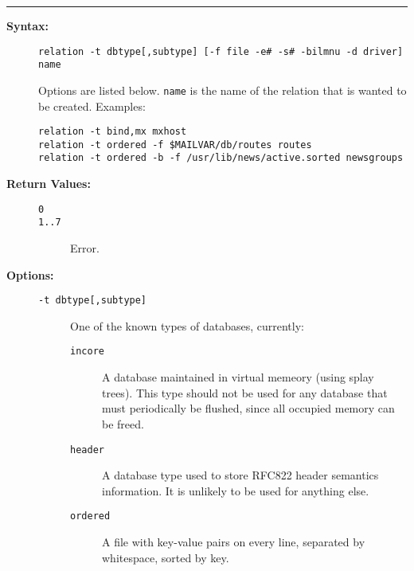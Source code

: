 \hrule
\begin{description}
\item[{\bf Syntax:}] \mbox{}

{\tt relation -t dbtype[,subtype] [-f file -e\# -s\# -bilmnu -d driver] name}

Options are listed below. {\tt name} is the name of the relation
that is wanted to be created. Examples:
\begin{tscreen}
\begin{verbatim}
relation -t bind,mx mxhost
relation -t ordered -f $MAILVAR/db/routes routes
relation -t ordered -b -f /usr/lib/news/active.sorted newsgroups
\end{verbatim}
\end{tscreen}




\item[{\bf Return Values:}] \mbox{}

\begin{description}
\item[{\tt 0}] \mbox{}



\item[{\tt 1..7}] \mbox{}

Error.

\end{description}


\item[{\bf Options:}] \mbox{}

\begin{description}
\item[{\tt -t dbtype[,subtype]}] \mbox{}

One of the known types 
of databases, currently: 
\begin{description}
\item[{\tt incore}] \mbox{}

A database maintained in virtual memeory (using 
splay trees). This type should not be used for any database that must 
periodically be flushed, since all occupied memory can be freed.

\item[{\tt header}] \mbox{}

A database type used to store RFC822 header 
semantics information. It is unlikely to be used for anything else.

\item[{\tt ordered}] \mbox{}

A file with key-value pairs on every line, 
separated by whitespace, sorted by key. 


\end{description}
\end{description}
\end{description}
